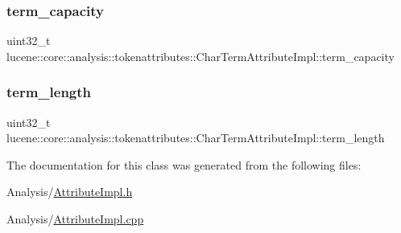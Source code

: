 \subsubsection{\texorpdfstring{term\+\_\+capacity}{term\_capacity}}
{\footnotesize\ttfamily uint32\+\_\+t lucene\+::core\+::analysis\+::tokenattributes\+::\+Char\+Term\+Attribute\+Impl\+::term\+\_\+capacity\hspace{0.3cm}{\ttfamily [private]}}

\mbox{\label{classlucene_1_1core_1_1analysis_1_1tokenattributes_1_1CharTermAttributeImpl_a746eb5a710afd01df9c4170ea0e0ce3e}} 
\subsubsection{\texorpdfstring{term\+\_\+length}{term\_length}}
{\footnotesize\ttfamily uint32\+\_\+t lucene\+::core\+::analysis\+::tokenattributes\+::\+Char\+Term\+Attribute\+Impl\+::term\+\_\+length\hspace{0.3cm}{\ttfamily [private]}}



The documentation for this class was generated from the following files\+:\begin{DoxyCompactItemize}
\item 
Analysis/\mbox{\hyperlink{AttributeImpl_8h}{Attribute\+Impl.\+h}}\item 
Analysis/\mbox{\hyperlink{AttributeImpl_8cpp}{Attribute\+Impl.\+cpp}}\end{DoxyCompactItemize}
